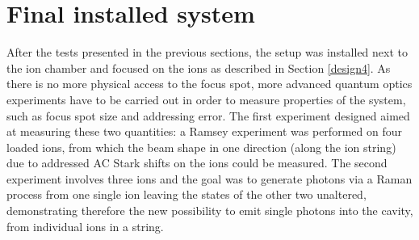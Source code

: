 \newpage
\section{Final installed system}
\label{sec:finalsetup}
After the tests presented in the previous sections, the setup was installed next to the ion chamber and focused on the ions as described in Section \ref{design4}. As there is no more physical access to the focus spot, more advanced quantum optics experiments have to be carried out in order to measure properties of the system, such as focus spot size and addressing error. The first experiment designed aimed at measuring these two quantities: a Ramsey experiment was performed on four loaded ions, from which the beam shape in one direction (along the ion string) due to addressed AC Stark shifts on the ions could be measured.
The second experiment involves three ions and the goal was to generate photons via a Raman process from one single ion leaving the states of the other two unaltered, demonstrating therefore the new possibility to emit single photons into the cavity, from individual ions in a string.


